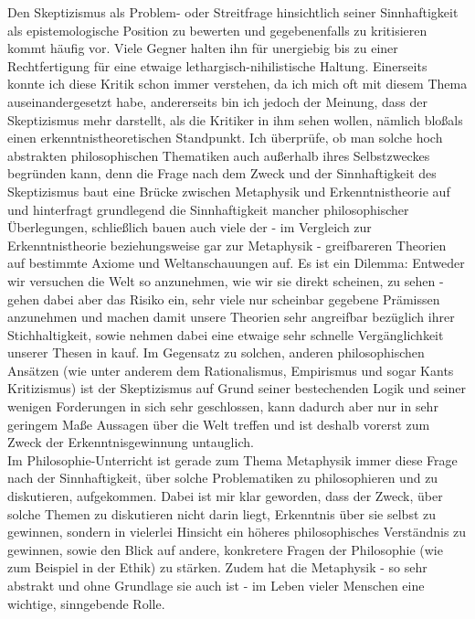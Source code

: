 \documentclass[12pt,a4paper,final]{article}
\begin{document}
Den Skeptizismus als Problem- oder Streitfrage hinsichtlich seiner Sinnhaftigkeit als epistemologische Position zu bewerten und gegebenenfalls zu kritisieren kommt häufig vor. Viele Gegner halten ihn für unergiebig bis zu einer Rechtfertigung für eine etwaige lethargisch-nihilistische Haltung. Einerseits konnte ich diese Kritik schon immer verstehen, da ich mich oft mit diesem Thema auseinandergesetzt habe, andererseits bin ich jedoch der Meinung, dass der Skeptizismus mehr darstellt, als die Kritiker in ihm sehen wollen, nämlich \glqq bloß\grqq als einen erkenntnistheoretischen Standpunkt.%
Ich überprüfe, ob man solche hoch abstrakten philosophischen Thematiken auch außerhalb ihres Selbstzweckes begründen kann, %
denn die Frage nach dem Zweck und der Sinnhaftigkeit des Skeptizismus baut eine Brücke zwischen Metaphysik und Erkenntnistheorie auf und hinterfragt grundlegend die Sinnhaftigkeit mancher philosophischer Überlegungen, schließlich bauen auch viele der - im Vergleich zur Erkenntnistheorie beziehungsweise gar zur Metaphysik - greifbareren Theorien auf bestimmte Axiome und Weltanschauungen auf. Es ist ein Dilemma: Entweder wir versuchen die Welt so anzunehmen, wie wir sie direkt scheinen, zu sehen - gehen dabei aber das Risiko ein, sehr viele nur scheinbar gegebene Prämissen anzunehmen und machen damit unsere Theorien sehr angreifbar bezüglich ihrer Stichhaltigkeit, sowie nehmen dabei eine etwaige sehr schnelle Vergänglichkeit unserer Thesen in kauf.
Im Gegensatz zu solchen, anderen philosophischen Ansätzen (wie unter anderem dem Rationalismus, Empirismus und sogar Kants Kritizismus) ist der Skeptizismus auf Grund seiner bestechenden Logik und seiner wenigen Forderungen in sich sehr geschlossen, kann dadurch aber nur in sehr geringem Maße Aussagen über die Welt treffen und ist deshalb vorerst zum Zweck der Erkenntnisgewinnung untauglich.\\ %

%
%
Im Philosophie-Unterricht ist gerade zum Thema Metaphysik immer diese Frage nach der Sinnhaftigkeit, über solche Problematiken zu philosophieren und zu diskutieren, aufgekommen. %
Dabei ist mir klar geworden, dass der Zweck, über solche Themen zu diskutieren nicht darin liegt, Erkenntnis über sie selbst zu gewinnen, sondern in vielerlei Hinsicht ein höheres philosophisches Verständnis zu gewinnen, sowie den Blick auf andere, konkretere Fragen der Philosophie (wie zum Beispiel in der Ethik) zu stärken. Zudem hat die Metaphysik - so sehr abstrakt und ohne Grundlage sie auch ist - im Leben vieler Menschen eine wichtige, sinngebende Rolle.
\end{document}
